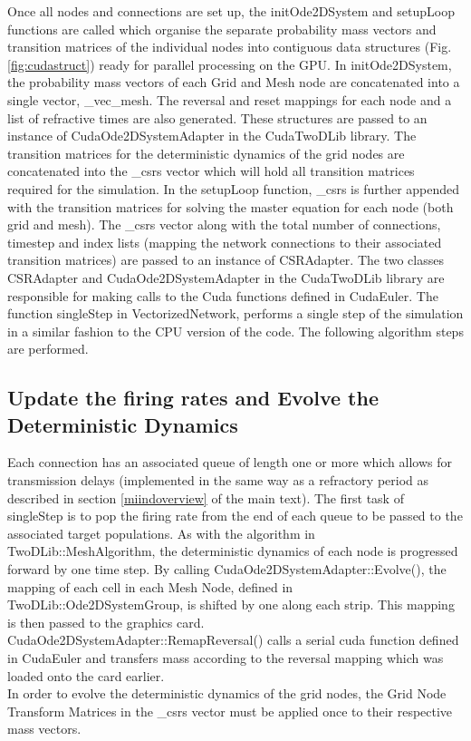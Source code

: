 \documentclass[utf8]{frontiers_suppmat} %
\begin{document}
Once all nodes and connections are set up, the initOde2DSystem and setupLoop functions are called which organise the separate probability mass vectors and transition matrices of the individual nodes into contiguous data structures (Fig. \ref{fig:cudastruct}) ready for parallel processing on the GPU. In initOde2DSystem, the probability mass vectors of each Grid and Mesh node are concatenated into a single vector, \_vec\_mesh. The reversal and reset mappings for each node and a list of refractive times are also generated. These structures are passed to an instance of CudaOde2DSystemAdapter in the CudaTwoDLib library. The transition matrices for the deterministic dynamics of the grid nodes are concatenated into the \_csrs vector which will hold all transition matrices required for the simulation. In the setupLoop function, \_csrs is further appended with the transition matrices for solving the master equation for each node (both grid and mesh). The \_csrs vector along with the total number of connections, timestep and index lists (mapping the network connections to their associated transition matrices) are passed to an instance of CSRAdapter. The two classes CSRAdapter and CudaOde2DSystemAdapter in the CudaTwoDLib library are responsible for making calls to the Cuda functions defined in CudaEuler. The function singleStep in VectorizedNetwork, performs a single step of the simulation in a similar fashion to the CPU version of the code. The following algorithm steps are performed.\\

\subsection{Update the firing rates and Evolve the Deterministic Dynamics}

Each connection has an associated queue of length one or more which allows for transmission delays (implemented in the same way as a refractory period as described in section \ref{miindoverview} of the main text). The first task of singleStep is to pop the firing rate from the end of each queue to be passed to the associated target populations. As with the algorithm in TwoDLib::MeshAlgorithm, the deterministic dynamics of each node is progressed forward by one time step. By calling CudaOde2DSystemAdapter::Evolve(), the mapping of each cell in each Mesh Node, defined in TwoDLib::Ode2DSystemGroup, is shifted by one along each strip. This mapping is then passed to the graphics card. CudaOde2DSystemAdapter::RemapReversal() calls a serial cuda function defined in CudaEuler and transfers mass according to the reversal mapping which was loaded onto the card earlier. \\
In order to evolve the deterministic dynamics of the grid nodes, the Grid Node Transform Matrices in the \_csrs vector must be applied once to their respective mass vectors. \\
\end{document}
